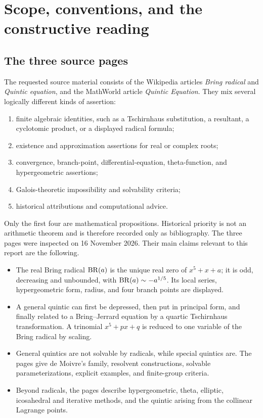 \section{Scope, conventions, and the constructive reading}\label{sec:scope}

\subsection{The three source pages}

The requested source material consists of the Wikipedia articles
\emph{Bring radical} and \emph{Quintic equation}, and the MathWorld article
\emph{Quintic Equation}.  They mix several logically different kinds of
assertion:

\begin{enumerate}
\item finite algebraic identities, such as a Tschirnhaus substitution, a
      resultant, a cyclotomic product, or a displayed radical formula;
\item existence and approximation assertions for real or complex roots;
\item convergence, branch-point, differential-equation, theta-function, and
      hypergeometric assertions;
\item Galois-theoretic impossibility and solvability criteria;
\item historical attributions and computational advice.
\end{enumerate}

Only the first four are mathematical propositions.  Historical priority is not
an arithmetic theorem and is therefore recorded only as bibliography.  The
three pages were inspected on 16 November 2026.  Their main claims relevant to
this report are the following.

\begin{itemize}
\item The real Bring radical \(\operatorname{BR}(a)\) is the unique real zero of
      \(x^5+x+a\); it is odd, decreasing and unbounded, with
      \(\operatorname{BR}(a)\sim-a^{1/5}\).  Its local series, hypergeometric form, radius,
      and four branch points are displayed.
\item A general quintic can first be depressed, then put in principal form,
      and finally related to a Bring--Jerrard equation by a quartic
      Tschirnhaus transformation.  A trinomial \(x^5+px+q\) is reduced to one
      variable of the Bring radical by scaling.
\item General quintics are not solvable by radicals, while special quintics
      are.  The pages give de Moivre's family, resolvent constructions,
      solvable parameterizations, explicit examples, and finite-group
      criteria.
\item Beyond radicals, the pages describe hypergeometric, theta, elliptic,
      icosahedral and iterative methods, and the quintic arising from the
      collinear Lagrange points.
\end{itemize}


